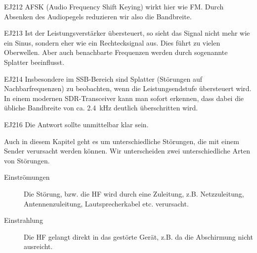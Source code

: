 \begin{sol}{EJ212}
AFSK (Audio Frequency Shift Keying) wirkt hier wie FM. Durch Absenken des Audiopegels reduzieren wir also die Bandbreite.
\end{sol}

\begin{sol}{EJ213}
Ist der Leistungsverstärker übersteuert, so sieht das Signal nicht mehr wie ein Sinus, sondern eher wie ein Rechtecksignal aus. Dies führt zu vielen Oberwellen. Aber auch benachbarte Frequenzen werden durch sogenannte Splatter beeinflusst.
\end{sol}

\begin{sol}{EJ214}
Insbesondere im SSB-Bereich sind Splatter (Störungen auf Nachbarfrequenzen) zu beobachten, wenn die Leistungsendstufe übersteuert wird. In einem modernen SDR-Transceiver kann man sofort erkennen, dass dabei die 
übliche Bandbreite von ca. \SI{2.4} {\kilo\hertz }  deutlich überschritten wird.
\end{sol}

\begin{sol}{EJ216}
  Die Antwort sollte unmittelbar klar sein.
\end{sol}


\begin{ohmchapter}
Auch in diesem Kapitel geht es um unterschiedliche Störungen, die mit einem Sender verursacht werden können.
Wir unterscheiden zwei unterschiedliche Arten von Störungen.

\begin{description}
  \item[Einströmungen] Die Störung, bzw. die HF wird durch eine Zuleitung, z.B. Netzzuleitung, Antennenzuleitung, Lautsprecherkabel etc. verursacht. 
  \item[Einstrahlung] Die HF gelangt direkt in das gestörte Gerät, z.B. da die Abschirmung nicht ausreicht.
\end{description}

\end{ohmchapter}

